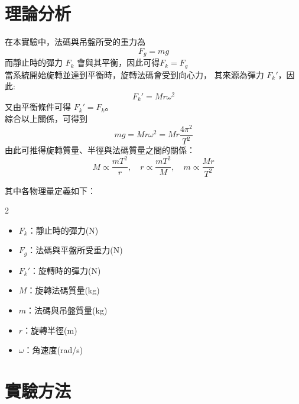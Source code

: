 \documentclass[12pt]{article}
\begin{document}
\section{\textbf{理論分析}}

\noindent
在本實驗中，法碼與吊盤所受的重力為
\[
F_g = mg
\]
而靜止時的彈力 $F_k$ 會與其平衡，因此可得$F_k = F_g$
\noindent
\\當系統開始旋轉並達到平衡時，旋轉法碼會受到向心力，
其來源為彈力 $F_k'$，因此:
\[
F_k' = Mr\omega^2
\]
又由平衡條件可得 $F_k' = F_k$。\\
綜合以上關係，可得到
\[
mg = Mr\omega^2 = Mr\frac{4\pi^2}{T^2}
\]
由此可推得旋轉質量、半徑與法碼質量之間的關係：
\[
M \propto \frac{mT^2}{r}, \quad
r \propto \frac{mT^2}{M}, \quad
m \propto \frac{Mr}{T^2}
\]

\bigskip
\noindent
其中各物理量定義如下：
\begin{multicols}{2}  %
\renewcommand{\labelitemi}{}  %
\begin{itemize}
    \item $F_k$：靜止時的彈力(\si{\newton})
    \item $F_g$：法碼與平盤所受重力(\si{\newton})
    \item $F_k'$：旋轉時的彈力(\si{\newton})
    \item $M$：旋轉法碼質量(\si{\kilogram})
    \item $m$：法碼與吊盤質量(\si{\kilogram})
    \item $r$：旋轉半徑(\si{\meter})
    \item $\omega$：角速度(rad/s)
\end{itemize}
\end{multicols}


\section{\textbf{實驗方法}}
    
\end{document}
